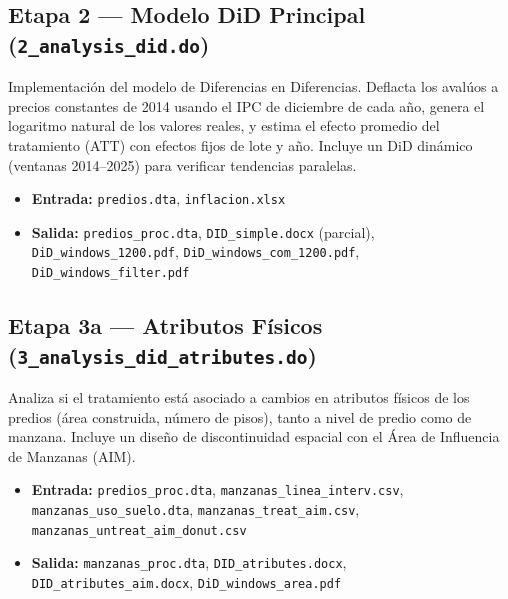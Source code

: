 \documentclass[12pt, a4paper]{article}
\begin{document}
\subsection{Etapa 2 — Modelo DiD Principal (\texttt{2\_analysis\_did.do})}

Implementación del modelo de Diferencias en Diferencias. Deflacta los avalúos a precios constantes de 2014 usando el IPC de diciembre de cada año, genera el logaritmo natural de los valores reales, y estima el efecto promedio del tratamiento (ATT) con efectos fijos de lote y año. Incluye un DiD dinámico (ventanas 2014–2025) para verificar tendencias paralelas.

\begin{itemize}
  \item \textbf{Entrada:} \texttt{predios.dta}, \texttt{inflacion.xlsx}
  \item \textbf{Salida:} \texttt{predios\_proc.dta}, \texttt{DID\_simple.docx} (parcial), \texttt{DiD\_windows\_1200.pdf}, \texttt{DiD\_windows\_com\_1200.pdf}, \texttt{DiD\_windows\_filter.pdf}
\end{itemize}

\subsection{Etapa 3a — Atributos Físicos (\texttt{3\_analysis\_did\_atributes.do})}

Analiza si el tratamiento está asociado a cambios en atributos físicos de los predios (área construida, número de pisos), tanto a nivel de predio como de manzana. Incluye un diseño de discontinuidad espacial con el Área de Influencia de Manzanas (AIM).

\begin{itemize}
  \item \textbf{Entrada:} \texttt{predios\_proc.dta}, \texttt{manzanas\_linea\_interv.csv}, \texttt{manzanas\_uso\_suelo.dta}, \texttt{manzanas\_treat\_aim.csv}, \texttt{manzanas\_untreat\_aim\_donut.csv}
  \item \textbf{Salida:} \texttt{manzanas\_proc.dta}, \texttt{DID\_atributes.docx}, \texttt{DID\_atributes\_aim.docx}, \texttt{DiD\_windows\_area.pdf}
\end{itemize}

\end{document}
